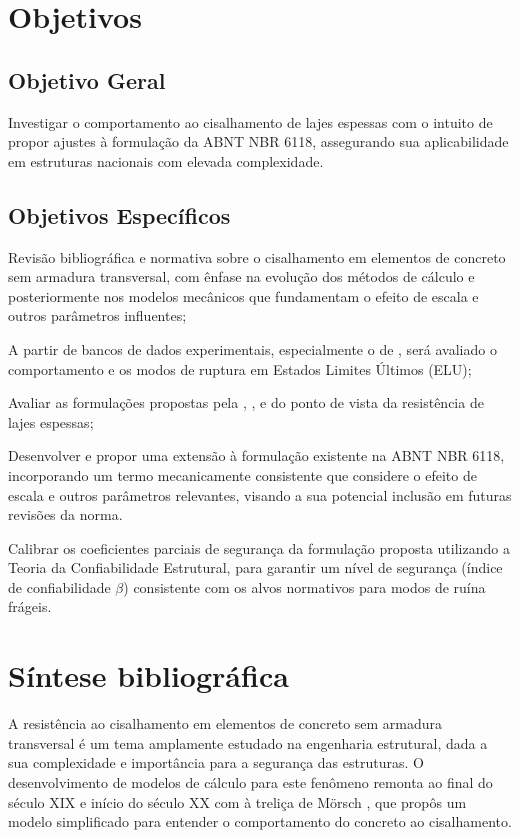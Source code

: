 \chapter{Objetivos}
\section{Objetivo Geral}

Investigar o comportamento ao cisalhamento de lajes espessas com o intuito de propor ajustes à formulação da ABNT NBR 6118, assegurando sua aplicabilidade em estruturas nacionais com elevada complexidade.

\section{Objetivos Específicos}
\begin{alineas}
    \item Revisão bibliográfica e normativa sobre o cisalhamento em elementos de concreto sem armadura transversal, com ênfase na evolução dos métodos de cálculo e posteriormente nos modelos mecânicos que fundamentam o efeito de escala e outros parâmetros influentes;
    \item A partir de bancos de dados experimentais, especialmente o de \textcite{Kuchma2019}, será avaliado o comportamento e os modos de ruptura em Estados Limites Últimos (ELU);
    \item Avaliar as formulações propostas pela \textcite{NBR6118:2023}, \textcite{CEN2004}, \textcite{ACI318:2019} e \textcite{FIB:2020} do ponto de vista da resistência de lajes espessas;
    \item Desenvolver e propor uma extensão à formulação existente na ABNT NBR 6118, incorporando um termo mecanicamente consistente que considere o efeito de escala e outros parâmetros relevantes, visando a sua potencial inclusão em futuras revisões da norma.
    \item Calibrar os coeficientes parciais de segurança da formulação proposta utilizando a Teoria da Confiabilidade Estrutural, para garantir um nível de segurança (índice de confiabilidade $\beta$) consistente com os alvos normativos para modos de ruína frágeis.
\end{alineas}

\chapter{Síntese bibliográfica}

A resistência ao cisalhamento em elementos de concreto sem armadura transversal é um tema amplamente estudado na engenharia estrutural, dada a sua complexidade e importância para a segurança das estruturas. O desenvolvimento de modelos de cálculo para este fenômeno remonta ao final do século XIX e início do século XX com à treliça de Mörsch \cite{Morsch1909}, que propôs um modelo simplificado para entender o comportamento do concreto ao cisalhamento.

